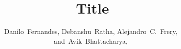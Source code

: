 \documentclass[journal]{IEEEtran}
\begin{document}
%
\title{Title}
%
%
%

\author{Danilo~Fernandes,
        Debanshu~Ratha,
        Alejandro~C.~Frery,~
        and~Avik~Bhattacharya,~%
}

% 
%
\end{document}

